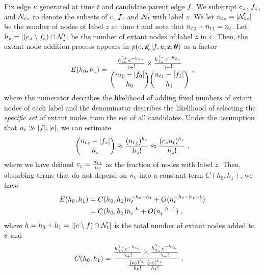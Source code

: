 \documentclass[aps,pre,reprint,superscriptaddress,nofootinbib]{revtex4-2}
\begin{document}
        Fix edge $e$ generated at time $t$ and candidate parent edge $f$. 
        We subscript $e_z$, $f_z$, and ${\mathcal{N}_{t}}_z$ to denote the subsets of $e$, $f$, and $\mathcal{N}_{t}$ with label $z$.
        We let ${n_{t}}_z = |{\mathcal{N}_{t}}_z|$ be the number of nodes of label $z$ at time $t$ and note that ${n_{t}}_0 + {n_{t}}_1 = n_{t}$.
        Let $h_z = |(e_z \setminus f_z )\cap \mathcal{N}_z^t|$ be the number of extant nodes of label $z$ in $e$.
        Then, the extant node addition process appears in $p(e,\mathbf{z}_e' | f, u, \mathbf{z}; \boldsymbol{\theta})$ as a factor 
        \begin{align}
            E(h_0, h_1) = \frac{\frac{h_{z_u}^{\gamma_+} e^{-h_{z_u}}}{\gamma_+!}\times\frac{h_{\bar{z}_u}^{\gamma_-} e^{-h_{\bar{z}_u}}}{\gamma_-!}}{\dbinom{{n_{t}}_0 - |f_{0}|}{h_{0}}\dbinom{{n_{t}}_1 - |f_{1}|}{h_{1}}} \;,
        \end{align}
        where the numerator describes the likelihood of adding fixed numbers of extant nodes of each label and the denominator describes the likelihood of selecting the \emph{specific set} of extant nodes from the set of all candidates. 
        Under the assumption that $n_{t} \gg |f|, |e|$, we can estimate 
        \begin{align}
            \dbinom{{n_{t}}_z - |f_{z}|}{h_{z}} \approx \frac{({n_{t}}_z)^{h_z}}{h_z!} \approx \frac{(c_z n_{t})^{h_z}}{h_z!} \;,
        \end{align}
        where we have defined $c_z = \frac{{n_{t}}_z}{n_{t}}$ as the fraction of nodes with label $z$. 
        Then, absorbing terms that do not depend on $n_{t}$ into a constant term $C(h_0, h_1)$, we have 
        \begin{align}
            E(h_0, h_1) &=  C(h_0, h_1) n_{t}^{-h_0 - h_1} + O(n_{t}^{-h_0 - h_1 - 1}) \\ 
                        &= C(h_0, h_1) n_{t}^{-h} + O(n_{t}^{-h - 1}) \;,
        \end{align}
        where $h = h_0 + h_1 = |(e \setminus f) \cap \mathcal{N}_{t}|$ is the total number of extant nodes added to $e$ and 
        \begin{align}
            C(h_0, h_1) &= \frac{\frac{h_{z_u}^{\gamma_+} e^{-h_{z_u}}}{\gamma_+!}\times\frac{h_{\bar{z}_u}^{\gamma_-} e^{-h_{\bar{z}_u}}}{\gamma_-!}}{\frac{(c_0)^{h_0}}{h_0!}\frac{(c_1)^{h_1}}{h_1!}} \;.
        \end{align}
\end{document}
